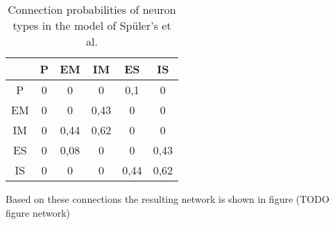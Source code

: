 \begin{table}[h]
	\centering
		\begin{tabular}{ |c|c|c|c|c|c|  }
			\hline
			   & P &  EM  & IM   & ES   & IS    \\ \hline
			P  & 0 &  0   & 0    & 0,1  & 0      \\
			EM & 0 &  0   & 0,43 & 0    & 0     \\
			IM & 0 & 0,44 & 0,62 & 0    & 0      \\
			ES & 0 & 0,08 & 0    & 0    & 0,43   \\
			IS & 0 &  0   & 0    & 0,44 &  0,62 \\ \hline
		\end{tabular}
	\caption[Spüler's et al. model's connection probabilities ]{Connection probabilities of neuron types in the model of Spüler's et al.}
	\label{table:SpuelerConnectionProbs}
\end{table}
%
Based on these connections the resulting network is shown in figure (TODO figure network)




